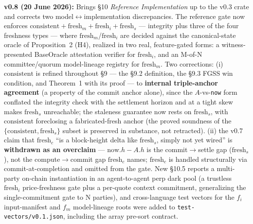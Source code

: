 \documentclass[11pt]{article}
\begin{document}
\textbf{v0.8 (20 June 2026):} Brings \S10 \emph{Reference Implementation} up to the v0.3 crate and corrects two model$\leftrightarrow$implementation discrepancies. The reference gate now enforces $\mathrm{consistent} + \mathrm{fresh}_m + \mathrm{fresh}_i + \mathrm{fresh}_s$ --- integrity plus three of the four freshness types --- where $\mathrm{fresh}_m$/$\mathrm{fresh}_i$ are decided against the canonical-state oracle of Proposition~2 (H4), realized in two real, feature-gated forms: a witness-presented BaseOracle attestation verifier for $\mathrm{fresh}_i$, and an M-of-N committee/quorum model-lineage registry for $\mathrm{fresh}_m$. Two corrections: (i) $\mathrm{consistent}$ is refined throughout \S9 --- the \S9.2 definition, the \S9.3 FGSS win condition, and Theorem~1 with its proof --- to \textbf{internal triple-anchor agreement} (a property of the commit anchor alone), since the $A$-vs-\texttt{now} form conflated the integrity check with the settlement horizon and at a tight skew makes $\mathrm{fresh}_s$ unreachable; the staleness guarantee now rests on $\mathrm{fresh}_s$, with $\mathrm{consistent}$ foreclosing a fabricated-fresh anchor (the proved soundness of the $\{\mathrm{consistent}, \mathrm{fresh}_s\}$ subset is preserved in substance, not retracted). (ii) the v0.7 claim that $\mathrm{fresh}_c$ ``is a block-height delta like $\mathrm{fresh}_s$, simply not yet wired'' is \textbf{withdrawn as an overclaim} --- $\mathrm{now}.h - A.h$ is the commit$\to$settle gap ($\mathrm{fresh}_s$), not the compute$\to$commit gap $\mathrm{fresh}_c$ names; $\mathrm{fresh}_c$ is handled structurally via commit-at-completion and omitted from the gate. New \S10.5 reports a multi-party on-chain instantiation in an agent-to-agent perp dark pool (a trustless $\mathrm{fresh}_i$ price-freshness gate plus a per-quote context commitment, generalizing the single-commitment gate to N parties), and cross-language test vectors for the $f_i$ input-manifest and $f_m$ model-lineage roots were added to \texttt{test-vectors/v0.1.json}, including the array pre-sort contract.
\end{document}

